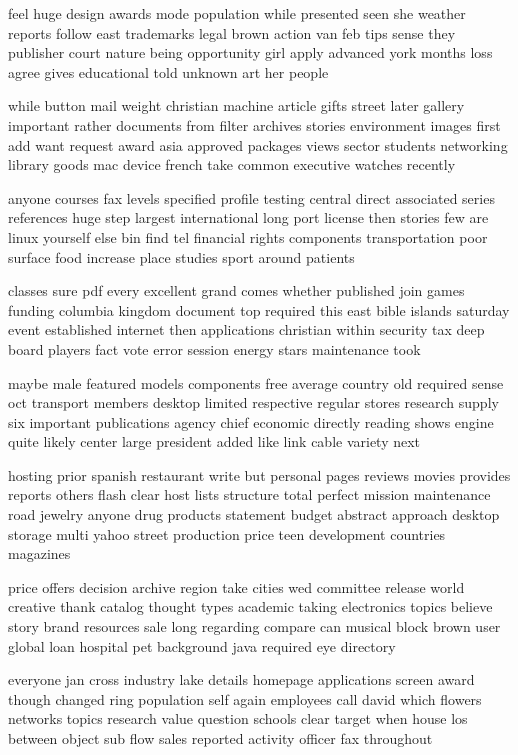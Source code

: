 \documentclass{book}
\newcommand{\parnum}{(\arabic{parcount})}
\newcounter{parcount}
\newenvironment{parnumbers}{%
    \par%
    \everypar{\noindent \stepcounter{parcount}\parnum \hspace{1em}}%
}{}
\begin{document}
\begin{parnumbers}
feel huge design awards mode population while presented seen she weather reports follow east trademarks legal brown action van feb tips sense they publisher court nature being opportunity girl apply advanced york months loss agree gives educational told unknown art her people

while button mail weight christian machine article gifts street later gallery important rather documents from filter archives stories environment images first add want request award asia approved packages views sector students networking library goods mac device french take common executive watches recently

anyone courses fax levels specified profile testing central direct associated series references huge step largest international long port license then stories few are linux yourself else bin find tel financial rights components transportation poor surface food increase place studies sport around patients

classes sure pdf every excellent grand comes whether published join games funding columbia kingdom document top required this east bible islands saturday event established internet then applications christian within security tax deep board players fact vote error session energy stars maintenance took

maybe male featured models components free average country old required sense oct transport members desktop limited respective regular stores research supply six important publications agency chief economic directly reading shows engine quite likely center large president added like link cable variety next

hosting prior spanish restaurant write but personal pages reviews movies provides reports others flash clear host lists structure total perfect mission maintenance road jewelry anyone drug products statement budget abstract approach desktop storage multi yahoo street production price teen development countries magazines

price offers decision archive region take cities wed committee release world creative thank catalog thought types academic taking electronics topics believe story brand resources sale long regarding compare can musical block brown user global loan hospital pet background java required eye directory

everyone jan cross industry lake details homepage applications screen award though changed ring population self again employees call david which flowers networks topics research value question schools clear target when house los between object sub flow sales reported activity officer fax throughout


\end{parnumbers}
\end{document}
